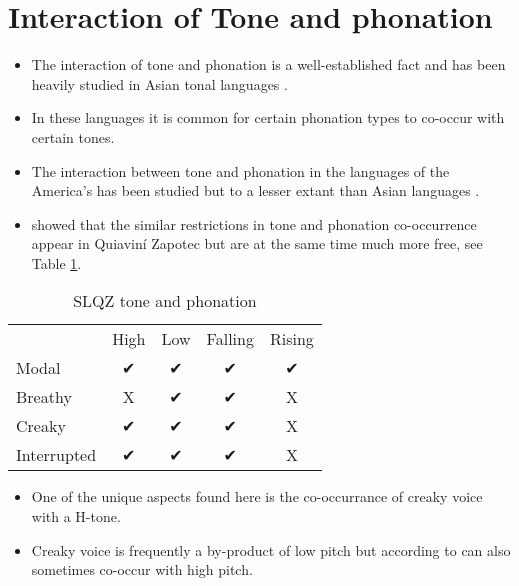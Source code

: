\documentclass[12pt, letterpaper]{article}
\providecommand{\lsptoprule}{\midrule\toprule}
\providecommand{\lspbottomrule}{\bottomrule\midrule}
\begin{document}
\section{Interaction of Tone and phonation} \label{sec:Interaction}

\begin{itemize}
	\item The interaction of tone and phonation is a well-established fact and has been heavily studied in Asian tonal languages \citep[see references in][]{yipTone2002, duanmuPhonologyStandardChinese2007,michaudComplexTonesEast2012,brunelleTonePhonationSoutheast2016}.
	\item In these languages it is common for certain phonation types to co-occur with certain tones.
	\item The interaction between tone and phonation in the languages of the America's has been studied but to a lesser extant than Asian languages \citep{adlerAcousticsPhonationTypes2016,chavez-peonInteractionMetricalStructure2010,dicanioCoarticulationToneGlottal2012}. 
	\item \citet{chavez-peonInteractionMetricalStructure2010} showed that the similar restrictions in tone and phonation co-occurrence appear in Quiaviní Zapotec but are at the same time much more free, see Table \ref{tab:slqz}.
\end{itemize}

\begin{table}[!h]
\centering
\caption{SLQZ tone and phonation}
\label{tab:slqz}
 \begin{tabular}{lcccc}
  \lsptoprule
  				&	 High  & Low & Falling & Rising \\
  	Modal	& ✔︎ & ✔︎ & ✔︎ & ✔︎ \\
  	Breathy & X & ✔︎ & ✔︎ & X \\
  	Creaky & ✔︎ & ✔︎ & ✔︎ & X \\
  	Interrupted & ✔︎ & ✔︎ & ✔︎ & X \\
  \lspbottomrule
 \end{tabular}
\end{table}

\begin{itemize}
	\item One of the unique aspects found here is the co-occurrance of creaky voice with a H-tone. 
	
	\item Creaky voice is frequently a by-product of low pitch but according to \citet{eslingVoiceQualityLaryngeal2019} can also sometimes co-occur with high pitch. 
\end{itemize}
\end{document}
